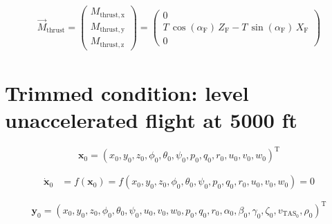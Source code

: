 \documentclass{article}
\begin{document}
\begin{dmath}
\begin{aligned}
\overrightarrow{M}_{\mathrm{thrust}}=\left(\begin{array}{c} M_{\mathrm{thrust,x}}\\ M_{\mathrm{thrust,y}}\\ M_{\mathrm{thrust,z}} \end{array}\right)=\left(\begin{array}{c} 0\\ T\,\cos\left(\alpha _{\mathrm{F}}\right)\,Z_{\mathrm{F}}-T\,\sin\left(\alpha _{\mathrm{F}}\right)\,X_{\mathrm{F}}\\ 0 \end{array}\right)
\end{aligned}
\end{dmath}

\newpage

\section{Trimmed condition: level unaccelerated flight at 5000 ft}

\begin{dmath}
\bm{x_{\mathrm{0}}}=(x_{\mathrm{0}}, y_{\mathrm{0}}, z_{\mathrm{0}}, \phi_{\mathrm{0}}, \theta_{\mathrm{0}}, \psi_{\mathrm{0}}, p_{\mathrm{0}}, q_{\mathrm{0}}, r_{\mathrm{0}}, u_{\mathrm{0}}, v_{\mathrm{0}}, w_{\mathrm{0}})^{\mathrm{T}}
\end{dmath}

\begin{dmath}
\begin{aligned}
\bm{\dot{x}_{\mathrm{0}}}&=f\left(\bm{x_{\mathrm{0}}}\right)=f\left(x_{\mathrm{0}}, y_{\mathrm{0}}, z_{\mathrm{0}}, \phi_{\mathrm{0}}, \theta_{\mathrm{0}}, \psi_{\mathrm{0}}, p_{\mathrm{0}}, q_{\mathrm{0}}, r_{\mathrm{0}}, u_{\mathrm{0}}, v_{\mathrm{0}}, w_{\mathrm{0}}\right)=0
\end{aligned}
\end{dmath}

\begin{dmath}
\bm{y_{\mathrm{0}}}=(x_{\mathrm{0}}, y_{\mathrm{0}}, z_{\mathrm{0}}, \phi_{\mathrm{0}}, \theta_{\mathrm{0}}, \psi_{\mathrm{0}}, u_{\mathrm{0}}, v_{\mathrm{0}}, w_{\mathrm{0}}, p_{\mathrm{0}}, q_{\mathrm{0}}, r_{\mathrm{0}}, \alpha_{\mathrm{0}}, \beta_{\mathrm{0}}, \gamma_{\mathrm{0}}, \zeta_{\mathrm{0}}, v_{\mathrm{TAS}_{\mathrm{0}}}, \rho_{\mathrm{0}})^{\mathrm{T}}
\end{dmath}
\end{document}
